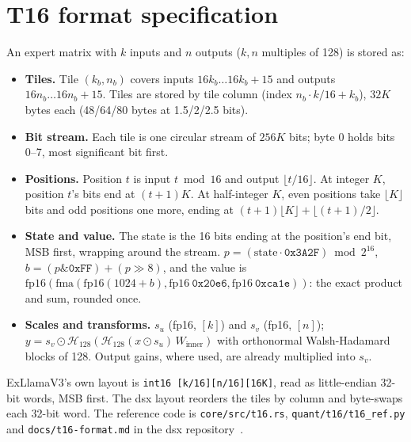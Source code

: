 \documentclass[10pt]{article}
\begin{document}
\section{T16 format specification}
\label{app:spec}
An expert matrix with $k$ inputs and $n$ outputs ($k, n$ multiples of 128) is stored as:
\begin{itemize}\setlength{\itemsep}{1pt}
\item \textbf{Tiles.} Tile $(k_b, n_b)$ covers inputs $16k_b \ldots 16k_b{+}15$ and outputs $16n_b \ldots 16n_b{+}15$.
Tiles are stored by tile column (index $n_b \cdot k/16 + k_b$), $32K$ bytes each (48/64/80 bytes at 1.5/2/2.5 bits).
\item \textbf{Bit stream.} Each tile is one circular stream of $256K$ bits; byte 0 holds bits 0--7, most significant bit
first.
\item \textbf{Positions.} Position $t$ is input $t \bmod 16$ and output $\lfloor t/16\rfloor$. At integer $K$, position
$t$'s bits end at $(t+1)K$. At half-integer $K$, even positions take $\lfloor K\rfloor$ bits and odd positions one
more, ending at $(t+1)\lfloor K\rfloor + \lfloor (t+1)/2\rfloor$.
\item \textbf{State and value.} The state is the 16 bits ending at the position's end bit, MSB first, wrapping around
the stream. $p = (\text{state}\cdot \texttt{0x3A2F}) \bmod 2^{16}$, $b = (p \mathbin{\&} \texttt{0xFF}) + (p \gg 8)$,
and the value is $\mathrm{fp16}(\mathrm{fma}(\mathrm{fp16}(1024+b), \mathrm{fp16}\ \texttt{0x20e6}, \mathrm{fp16}\
\texttt{0xca1e}))$: the exact product and sum, rounded once.
\item \textbf{Scales and transforms.} $s_u$ (fp16, $[k]$) and $s_v$ (fp16, $[n]$);
$y = s_v \odot \mathcal{H}_{128}(\mathcal{H}_{128}(x \odot s_u)\, W_{\text{inner}})$ with orthonormal Walsh-Hadamard
blocks of 128. Output gains, where used, are already multiplied into $s_v$.
\end{itemize}
ExLlamaV3's own layout is \texttt{int16 [k/16][n/16][16K]}, read as little-endian 32-bit words, MSB first. The dsx
layout reorders the tiles by column and byte-swaps each 32-bit word. The reference code is
\nolinkurl{core/src/t16.rs}, \nolinkurl{quant/t16/t16_ref.py} and \nolinkurl{docs/t16-format.md} in the dsx
repository~\cite{dsx}.
\end{document}
